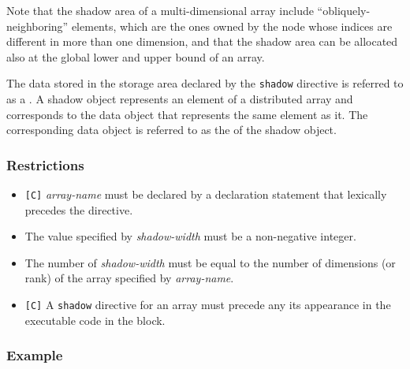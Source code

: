 Note that the shadow area of a multi-dimensional array include
``obliquely-neighboring'' elements, which are the ones owned by the node 
whose indices are different in more than one dimension, and that the
shadow area can be allocated also at the global lower and upper bound of
an array.

The data stored in the storage area declared by the {\tt shadow}
directive is referred to as a {\it {}}.
%
A shadow object represents an element of a distributed array and 
corresponds to the data object that represents the same
element as it. The corresponding data object is referred to as the
{\it {}} of the shadow object.



\subsubsection*{Restrictions}

\begin{itemize}
 \item \verb![C]! {\it array-name} must be declared by a declaration
       statement that lexically precedes the directive.
\item The value specified by {\it shadow-width} must be a non-negative
      integer.
\item The number of {\it shadow-width} must be equal to the number of
      dimensions (or rank) of the array specified by {\it array-name}.
\item \verb![C]! A {\tt shadow} directive for an array must
      precede any its appearance in the executable code in the block.
\end{itemize}

\subsubsection*{Example}

